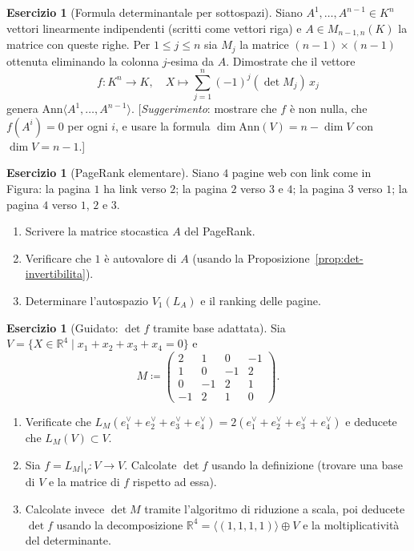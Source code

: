 \documentclass[11pt, a4paper]{book}
\theoremstyle{definition}
\newtheorem{esercizio}[definizione]{Esercizio}
\theoremstyle{plain}
\theoremstyle{remark}
\newcommand{\R}{\mathbb{R}}
\newcommand{\Ann}{\mathrm{Ann}}
\begin{document}
\begin{esercizio}[Formula determinantale per sottospazi]
\label{es:ann-det}
Siano $A^1,\ldots,A^{n-1} \in K^n$ vettori linearmente indipendenti (scritti come vettori riga) e $A \in M_{n-1,n}(K)$ la matrice con queste righe. Per $1 \leq j \leq n$ sia $M_j$ la matrice $(n-1)\times(n-1)$ ottenuta eliminando la colonna $j$-esima da $A$. Dimostrate che il vettore
\[
  f \colon K^n \to K, \quad X \mapsto \sum_{j=1}^n (-1)^j (\det M_j)\,x_j
\]
genera $\Ann\langle A^1,\ldots,A^{n-1}\rangle$. [\emph{Suggerimento}: mostrare che $f$ è non nulla, che $f(A^i)=0$ per ogni $i$, e usare la formula $\dim\Ann(V) = n - \dim V$ con $\dim V = n-1$.]
\end{esercizio}

\begin{esercizio}[PageRank elementare]
Siano $4$ pagine web con link come in Figura: la pagina $1$ ha link verso $2$; la pagina $2$ verso $3$ e $4$; la pagina $3$ verso $1$; la pagina $4$ verso $1$, $2$ e $3$.
\begin{enumerate}
  \item Scrivere la matrice stocastica $A$ del PageRank.
  \item Verificare che $1$ è autovalore di $A$ (usando la Proposizione~\ref{prop:det-invertibilita}).
  \item Determinare l'autospazio $V_1(L_A)$ e il ranking delle pagine.
\end{enumerate}
\end{esercizio}

\begin{esercizio}[Guidato: $\det f$ tramite base adattata]
Sia $V = \{X \in \R^4 \mid x_1+x_2+x_3+x_4=0\}$ e
\[
  M \coloneqq \begin{pmatrix}2&1&0&-1\\1&0&-1&2\\0&-1&2&1\\-1&2&1&0\end{pmatrix}.
\]
\begin{enumerate}
  \item Verificate che $L_M(e^\vee_1+e^\vee_2+e^\vee_3+e^\vee_4) = 2(e^\vee_1+e^\vee_2+e^\vee_3+e^\vee_4)$ e deducete che $L_M(V)\subset V$.
  \item Sia $f = L_M\vert_V \colon V \to V$. Calcolate $\det f$ usando la definizione (trovare una base di $V$ e la matrice di $f$ rispetto ad essa).
  \item Calcolate invece $\det M$ tramite l'algoritmo di riduzione a scala, poi deducete $\det f$ usando la decomposizione $\R^4 = \langle(1,1,1,1)\rangle \oplus V$ e la moltiplicatività del determinante.
\end{enumerate}
\end{esercizio}
\end{document}
